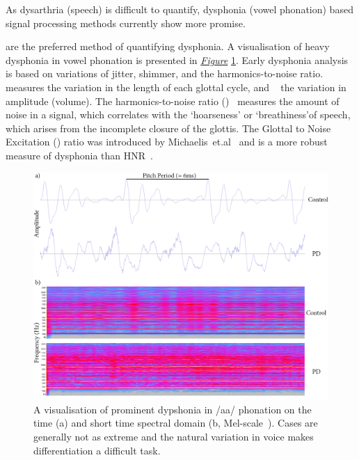 \documentclass[12pt, twoside]{book}
\renewcommand\emph[1]{\textit{\color{USred}{#1}}}
\begin{document}
\begin{highlight}
	As dysarthria (speech) is difficult to quantify, dysphonia (vowel phonation) based signal processing methods currently show more promise.
\end{highlight}
\emph{Sustained vowel phonations} are the preferred method of quantifying dysphonia. A visualisation of heavy dysphonia in vowel phonation is presented in \textit{\hyperref[spectrogram]{Figure}} \ref{spectrogram}. Early dysphonia analysis is based on variations of jitter, shimmer, and the harmonics-to-noise ratio. \emph{Jitter}~ measures the variation in the length of each glottal cycle, and \emph{shimmer}~\cite{shimmerjitter,jittertime} the variation in amplitude (volume). The harmonics-to-noise ratio (\emph{HNR})~\cite{HNRintro} measures the amount of noise in a signal, which correlates with the `hoarseness' or `breathiness'of speech, which arises from the incomplete closure of the glottis.  The Glottal to Noise Excitation (\emph{GNE}) ratio was introduced by Michaelis~et.al~\cite{gne} and is a more robust measure of dysphonia than HNR~\cite{gneratio}. 


\begin{figure}[!htb]
	\centering\centerline{\includegraphics[width=1.2\linewidth]{timespectrogram.png}}
	\caption{A visualisation of prominent dypshonia in /aa/ phonation on the time (a) and short time spectral domain (b, Mel-scale~\cite{mfscale}). Cases are generally not as extreme and the natural variation in voice makes differentiation a difficult task.}
	\label{spectrogram}
\end{figure}
\end{document}
